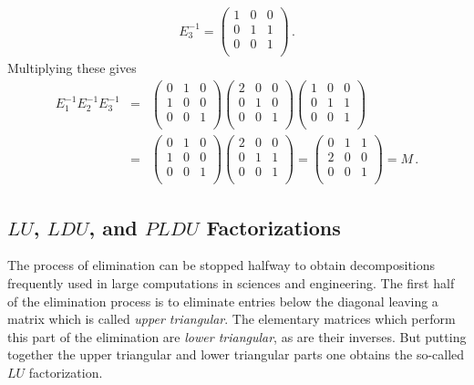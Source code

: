 \begin{example}
\begin{eqnarray*}
E_3^{-1}
= \left(\begin{array}{ccc}
1  &0 &0\\
0  &1 & 1\\ 
0  &0 &1\\
\end{array}  \right) \,.
\end{eqnarray*}
Multiplying these gives 
\begin{eqnarray*}
E_1^{-1}E_2^{-1}E_3^{-1}
&=& 
\left(\begin{array}{ccc}
0  &1 &0\\
1  &0 &0\\ 
0  &0 &1\\
\end{array}  \right)
 \left(\begin{array}{ccc}
2  &0 &0\\
0  &1 &0\\ 
0  &0 &1\\
\end{array}  \right) 
\left(\begin{array}{ccc}
1  &0 &0\\
0  &1 & 1\\ 
0  &0 &1\\
\end{array}  \right) 
\\[2mm] %
&=&
\left(\begin{array}{ccc}
0  &1 &0\\
1  &0 &0\\ 
0  &0 &1\\
\end{array}  \right)
 \left(\begin{array}{ccc}
2  &0 &0\\
0  &1 &1\\ 
0  &0 &1\\
\end{array}  \right) 
= %
\left(\begin{array}{ccc}
 0 &1 &1\\
2  &0 &0\\ 
0  &0 &1\\
\end{array}  \right)  = M \, .
\end{eqnarray*}
\end{example}

\subsection{$LU$, $LDU$, and $PLDU$ Factorizations}\label{LUtake1}
The process of elimination can be stopped halfway to obtain decompositions frequently used in large computations in sciences and engineering. 
The first half of the elimination process is to eliminate entries below the diagonal  
leaving a matrix which is called {\itshape upper triangular}. The elementary matrices which perform this part of the elimination are {\itshape lower triangular}, as are their inverses. But putting together the upper triangular and lower triangular parts one obtains the so-called $LU$ factorization.


